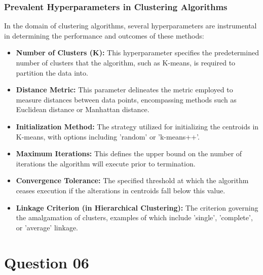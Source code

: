 \documentclass{exam}
\begin{document}
\subsubsection{Prevalent Hyperparameters in Clustering Algorithms}

In the domain of clustering algorithms, several hyperparameters are instrumental in determining the performance and outcomes of these methods:

\begin{itemize} 
 \item \textbf{Number of Clusters (K):} This hyperparameter specifies the predetermined number of clusters that the algorithm, such as K-means, is required to partition the data into.
 \item \textbf{Distance Metric:} This parameter delineates the metric employed to measure distances between data points, encompassing methods such as Euclidean distance or Manhattan distance.
 \item \textbf{Initialization Method:} The strategy utilized for initializing the centroids in K-means, with options including 'random' or 'k-means++'.
 \item \textbf{Maximum Iterations:} This defines the upper bound on the number of iterations the algorithm will execute prior to termination.
 \item \textbf{Convergence Tolerance:} The specified threshold at which the algorithm ceases execution if the alterations in centroids fall below this value.
 \item \textbf{Linkage Criterion (in Hierarchical Clustering):} The criterion governing the amalgamation of clusters, examples of which include 'single', 'complete', or 'average' linkage.
\end{itemize}

\section{Question 06}
\end{document}
